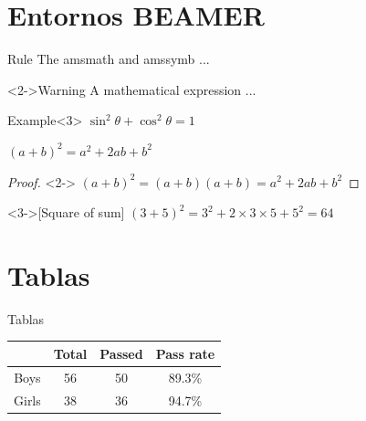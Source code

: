 \documentclass[12pt, aspectratio = 169]{beamer}
\begin{document}
    \section{Entornos BEAMER}
        \begin{frame}[t]
            \begin{block}{Rule}
                The amsmath and amssymb ...
            \end{block}
            \begin{alertblock}<2->{Warning}
                A mathematical expression ...
            \end{alertblock}
            \begin{exampleblock}{Example}<3>
                $\sin^2\theta + \cos^2\theta = 1$
            \end{exampleblock}
        \end{frame}
        \begin{frame}[t]
            \begin{theorem}
                $(a+b)^2=a^2 + 2ab + b^2$
            \end{theorem}
            \begin{proof}<2->
                $(a+b)^2=(a+b)(a+b)=a^2+2ab+b^2$
            \end{proof}
            \begin{example}<3->[Square of sum]
                $(3+5)^2=3^2+2\times3\times5+5^2=64$
            \end{example}
        \end{frame}
    
    \section{Tablas}
        \begin{frame}{Tablas}
            \begin{table}
                \flushleft
                \begin{tabular}{cccc}
                    \hline & {\bf Total} & {\bf Passed} & {\bf Pass rate}\\
                    \hline Boys & 56 & 50 & 89.3\%\\
                    Girls & 38 & 36 & 94.7\%\\
                    \hline
                \end{tabular}
            \end{table}
        \end{frame}
        
\end{document}
